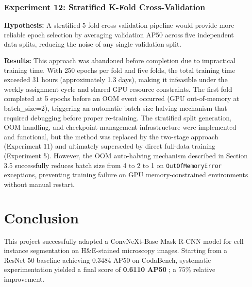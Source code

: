 \documentclass[12pt, a4paper]{article}
\begin{document}
\subsubsection{Experiment 12: Stratified K-Fold Cross-Validation}
\textbf{Hypothesis:} A stratified 5-fold cross-validation pipeline would provide more reliable epoch selection by averaging validation AP50 across five independent data splits, reducing the noise of any single validation split.

\textbf{Results:} This approach was abandoned before completion due to impractical training time. With 250 epochs per fold and five folds, the total training time exceeded 31 hours (approximately 1.3 days), making it infeasible under the weekly assignment cycle and shared GPU resource constraints. The first fold completed at 5 epochs before an OOM event occurred (GPU out-of-memory at batch\_size=2), triggering an automatic batch-size halving mechanism that required debugging before proper re-training. The stratified split generation, OOM handling, and checkpoint management infrastructure were implemented and functional, but the method was replaced by the two-stage approach (Experiment 11) and ultimately superseded by direct full-data training (Experiment 5). However, the OOM auto-halving mechanism described in Section 3.5 successfully reduces batch size from 4 to 2 to 1 on \texttt{OutOfMemoryError} exceptions, preventing training failure on GPU memory-constrained environments without manual restart.

\section{Conclusion}

This project successfully adapted a ConvNeXt-Base Mask R-CNN model for cell instance segmentation on H\&E-stained microscopy images. Starting from a ResNet-50 baseline achieving 0.3484 AP50 on CodaBench, systematic experimentation yielded a final score of \textbf{0.6110 AP50} ; a 75\% relative improvement.
\end{document}
